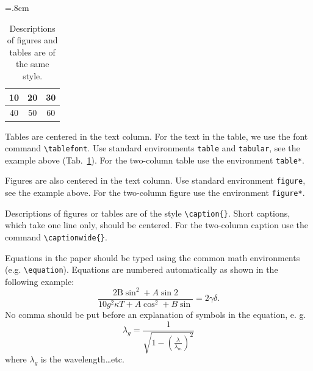 \documentclass{poster26}
\begin{document}
%
\begin{table}[h]
\begin{center}
{\renewcommand{\arraystretch}{1.4}
\tabcolsep=.8cm
\tablefont
\begin{tabular}{|c|c|c|}
\hline
10
&20
&30\\
\hline
40
&50
&60\\
\hline
\end{tabular}}
\caption{Descriptions of figures and tables are of the same style.}
\label{tab}
\end{center}
\end{table}
Tables are centered in the text column. For the text in the table, we use the font command \verb+\tablefont+. Use standard environments \verb+table+ and \verb+tabular+, see the example above (Tab.~\ref{tab}). For the two-column table use the environment \verb+table*+. 

Figures are also centered in the text column. Use standard environment \verb+figure+, see the example above. For the two-column figure use the environment \verb+figure*+. 

Descriptions of figures or tables are of the style \verb+\caption{}+. Short captions, which take one line only, should be centered. For the two-column caption use the command \verb+\captionwide{}+.

Equations in the paper should be typed using the common math  environments (e.g. \verb+\equation+). Equations are numbered automatically as shown in the following example:
\begin{equation}
\frac{2\mathrm{B} \sin^2 + A \sin2}{10 g^2 \kappa T + A \cos^2 + B \sin}= 2 \gamma\delta .
\end{equation}
No comma should be put before an explanation of symbols in the equation, e. g. 
\begin{equation}
       \lambda_g =\frac{1}{\sqrt{1-\left(\frac{\lambda}{\lambda_m}\right)^2}}
\end{equation}	
where $\lambda_g$ is the wavelength\dots etc.
\end{document}
